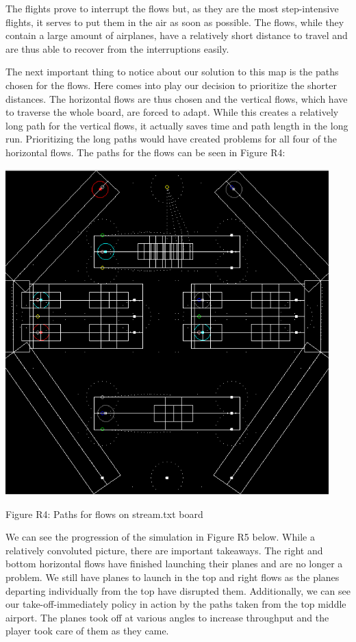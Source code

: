 \documentclass[10pt]{article}
\begin{document}
The flights prove to interrupt the flows but, as they are the most step-intensive flights, it serves to put them in the air as soon as possible. The flows, while they contain a large amount of airplanes, have a relatively short distance to travel and are thus able to recover from the interruptions easily.

The next important thing to notice about our solution to this map is the paths chosen for the flows. Here comes into play our decision to prioritize the shorter distances. The horizontal flows are thus chosen and the vertical flows, which have to traverse the whole board, are forced to adapt. While this creates a relatively long path for the vertical flows, it actually saves time and path length in the long run. Prioritizing the long paths would have created problems for all four of the horizontal flows. The paths for the flows can be seen in Figure R4:

\includegraphics[width=125mm]{pics/R4.png}
\caption{Figure R4: Paths for flows on stream.txt board}

We can see the progression of the simulation in Figure R5 below. While a relatively convoluted picture, there are important takeaways. The right and bottom horizontal flows have finished launching their planes and are no longer a problem. We still have planes to launch in the top and right flows as the planes departing individually from the top have disrupted them. Additionally, we can see our take-off-immediately policy in action by the paths taken from the top middle airport. The planes took off at various angles to increase throughput and the player took care of them as they came. 
\end{document}
